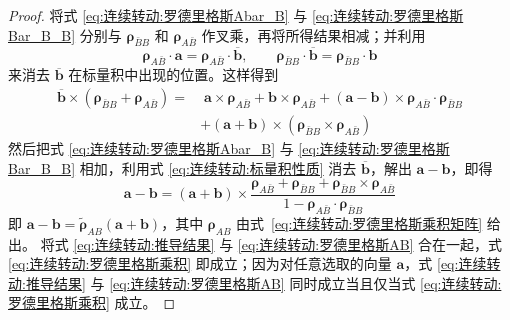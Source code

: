 \begin{proof}
将式 \eqref{eq:连续转动:罗德里格斯Abar_B} 与 \eqref{eq:连续转动:罗德里格斯Bar_B_B} 分别与 $\bm{\rho}_{\bar B B}$ 和 $\bm{\rho}_{A\bar B}$ 作叉乘，再将所得结果相减；并利用
\begin{equation}\label{eq:连续转动:标量积性质}
\bm{\rho}_{A\bar B}\cdot\mathbf{a}=\bm{\rho}_{A\bar B}\cdot\overline{\mathbf{b}},\qquad
\bm{\rho}_{\bar B B}\cdot\overline{\mathbf{b}}=\bm{\rho}_{\bar B B}\cdot\mathbf{b}
\end{equation}
来消去 $\overline{\mathbf{b}}$ 在标量积中出现的位置。这样得到
\begin{equation}
\begin{aligned}
\overline{\mathbf{b}}\times(\bm{\rho}_{\bar B B}+\bm{\rho}_{A\bar B})
=&\;\mathbf{a}\times\bm{\rho}_{A\bar B}+\mathbf{b}\times\bm{\rho}_{A\bar B}+(\mathbf{a}-\mathbf{b})\times\bm{\rho}_{A\bar B}\cdot\bm{\rho}_{\bar B B}\\
&+(\mathbf{a}+\mathbf{b})\times(\bm{\rho}_{\bar B B}\times\bm{\rho}_{A\bar B})
\end{aligned}
\end{equation}
然后把式 \eqref{eq:连续转动:罗德里格斯Abar_B} 与 \eqref{eq:连续转动:罗德里格斯Bar_B_B} 相加，利用式 \eqref{eq:连续转动:标量积性质} 消去 $\overline{\mathbf{b}}$，解出 $\mathbf{a}-\mathbf{b}$，即得
\begin{equation}\label{eq:连续转动:推导结果}
\mathbf{a}-\mathbf{b}=(\mathbf{a}+\mathbf{b})\times\frac{\bm{\rho}_{A\bar B}+\bm{\rho}_{\bar B B}+\bm{\rho}_{\bar B B}\times\bm{\rho}_{A\bar B}}{1-\bm{\rho}_{A\bar B}\cdot\bm{\rho}_{\bar B B}}
\end{equation}
即 $\mathbf{a}-\mathbf{b}=\widetilde{\bm{\rho}}_{AB}(\mathbf{a}+\mathbf{b})$，其中 $\bm{\rho}_{AB}$ 由式~\eqref{eq:连续转动:罗德里格斯乘积矩阵} 给出。
将式 \eqref{eq:连续转动:推导结果} 与 \eqref{eq:连续转动:罗德里格斯AB} 合在一起，式 \eqref{eq:连续转动:罗德里格斯乘积} 即成立；因为对任意选取的向量 $\mathbf{a}$，式 \eqref{eq:连续转动:推导结果} 与 \eqref{eq:连续转动:罗德里格斯AB} 同时成立当且仅当式 \eqref{eq:连续转动:罗德里格斯乘积} 成立。


\end{proof}
